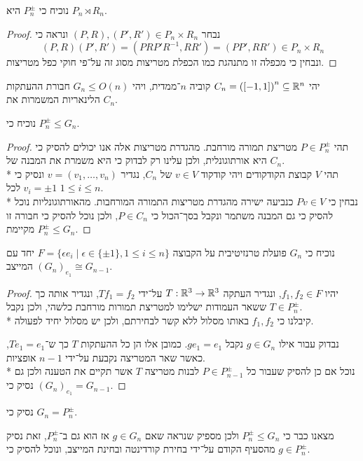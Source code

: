 \Subquestion{}
נוכיח כי $P_n^\pm$ היא $P_n \rtimes R_n$.
\begin{proof}
	נבחר $(P, R), (P', R') \in P_n \times R_n$ ונראה כי
	\[
		(P, R)(P', R') = (P R P' R^{-1}, R R') = (P P', R R') \in P_n \times R_n
	\]
	ונבחין כי מכפלה זו מתנהגת כמו הכפלת מטריצות מסוג זה על־פי חוקי כפל מטריצות.
\end{proof}

\Question{}
יהי $C_n = {([-1, 1])}^n \subseteq \mathbb{R}^n$ קוביה $n$־ממדית, ויהי $G_n \le O(n)$ חבורת ההעתקות הלינאריות המשמרות את $C_n$.

\Subquestion{}
נוכיח כי $P_n^\pm \le G_n$.
\begin{proof}
	תהי $P \in P_n^\pm$ מטריצת תמורה מורחבת. מהגדרת מטריצות אלה אנו יכולים להסיק כי היא אורתוגונלית, ולכן עלינו רק לבדוק כי היא משמרת את המבנה של $C_n$. \\*
	תהי $V$ קבוצת הקודקודים ויהי קודקוד $v \in V$ של $C_n$, נגדיר $v = (v_1, \dots, v_n)$ ונסיק כי $v_i = \pm 1$ לכל $1 \le i \le n$. \\*
	נבחין כי $P v \in V$ כנביעה ישירה מהגדרת מטריצות התמורה המורחבות.
	מהאורתוגונליות נוכל להסיק כי גם המבנה משתמר ונקבל בסך־הכול כי $P \in C_n$, ולכן נוכל להסיק כי חבורה זו מקיימת $P_n^\pm \le G_n$.
\end{proof}

\Subquestion{}
נוכיח כי $G_n$ פועלת טרנזיטיבית על הקבוצה $F = \{ \epsilon e_i \mid \epsilon \in \{ \pm 1 \}, 1 \le i \le n \}$ יחד עם המייצב ${(G_n)}_{e_1} \cong G_{n - 1}$.
\begin{proof}
	יהיו $f_1, f_2 \in F$, ונגדיר העתקה $T : \mathbb{R}^3 \to \mathbb{R}^3$ על־ידי $T f_1 = f_2$, ונגדיר אותה כך ששאר העמודות ישלימו למטריצת תמורות מורחבת כלשהי, ולכן נקבל $T \in P_n^\pm$. \\*
	קיבלנו כי $f_1, f_2$ באותו מסלול ללא קשר לבחירתם, ולכן יש מסלול יחיד לפעולה.

	נבדוק עבור אילו $g \in G_n$ נקבל $g e_1 = e_1$. כמובן אלו הן כל ההעתקות $T$ כך ש־$T e_1 = e_1$, כאשר שאר המטריצה נקבעת על־ידי $n - 1$ אופציות. \\*
	נוכל אם כן להסיק שעבור כל $P \in P_{n - 1}^\pm$ לבנות מטריצה $T$ אשר תקיים את הטענה ולכן גם נסיק כי ${(G_n)}_{e_1} = G_{n - 1}$.
\end{proof}

\Subquestion{}
נסיק כי $G_n = P_n^\pm$.

מצאנו כבר כי $P_n^\pm \le G_n$ ולכן מספיק שנראה שאם $g \in G_n$ אז הוא גם ב־$P_n^\pm$, זאת נסיק מהסעיף הקודם על־ידי בחירת קורדינטה ובחינת המייצב, ונוכל להסיק כי $g \in P_n^\pm$.


